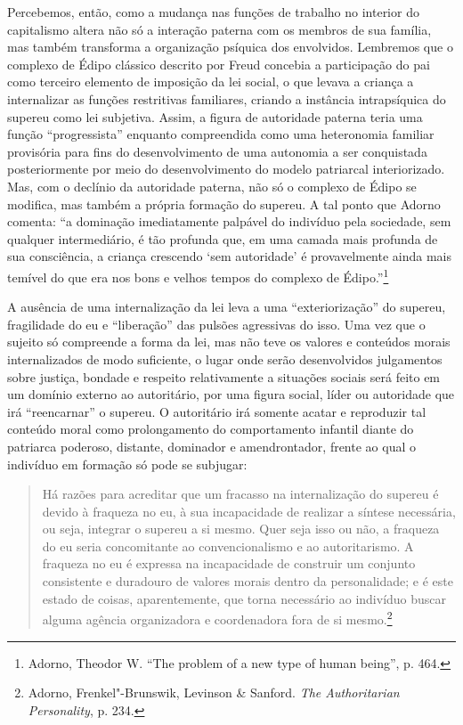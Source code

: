 Percebemos, então, como a mudança nas funções de trabalho no interior do
capitalismo altera não só a interação paterna com os membros de sua
família, mas também transforma a organização psíquica dos envolvidos.
Lembremos que o complexo de Édipo clássico descrito por Freud concebia a
participação do pai como terceiro elemento de imposição da lei social, o
que levava a criança a internalizar as funções restritivas familiares,
criando a instância intrapsíquica do supereu como lei subjetiva. Assim,
a figura de autoridade paterna teria uma função ``progressista''
enquanto compreendida como uma heteronomia familiar provisória para fins
do desenvolvimento de uma autonomia a ser conquistada posteriormente por
meio do desenvolvimento do modelo patriarcal interiorizado. Mas, com o
declínio da autoridade paterna, não só o complexo de Édipo se modifica,
mas também a própria formação do supereu. A tal ponto que Adorno
comenta: ``a dominação
imediatamente palpável do indivíduo pela sociedade, sem qualquer
intermediário, é tão profunda que, em uma camada mais profunda de sua
consciência, a criança crescendo `sem autoridade' é provavelmente ainda
mais temível do que era nos bons e velhos tempos do complexo de
Édipo.''\footnote{Adorno, Theodor W. ``The problem of a new type of
  human being'', p. 464.}

A ausência de uma internalização da lei leva a uma ``exteriorização'' do
supereu, fragilidade do eu e ``liberação'' das pulsões agressivas do
isso. Uma vez que o sujeito só compreende a forma da lei, mas não teve
os valores e conteúdos morais internalizados de modo suficiente, o lugar
onde serão desenvolvidos julgamentos sobre justiça, bondade e respeito
relativamente a situações sociais será feito em um domínio externo ao
autoritário, por uma figura social, líder ou autoridade que irá
``reencarnar'' o supereu. O autoritário irá somente acatar e reproduzir
tal conteúdo moral como prolongamento do comportamento infantil diante
do patriarca poderoso, distante, dominador e amendrontador, frente ao
qual o indivíduo em formação só pode se subjugar:

\begin{quote}
Há razões para acreditar que um fracasso na internalização do supereu é
devido à fraqueza no eu, à sua incapacidade de realizar a síntese
necessária, ou seja, integrar o supereu a si mesmo. Quer seja isso ou
não, a fraqueza do eu seria concomitante ao convencionalismo e ao
autoritarismo. A fraqueza no eu é expressa na incapacidade de construir
um conjunto consistente e duradouro de valores morais dentro da
personalidade; e é este estado de coisas, aparentemente, que torna
necessário ao indivíduo buscar alguma agência organizadora e
coordenadora fora de si mesmo.\footnote{Adorno, Frenkel"-Brunswik,
  Levinson \& Sanford. \emph{The Authoritarian Personality}, p. 234.}
\end{quote}

